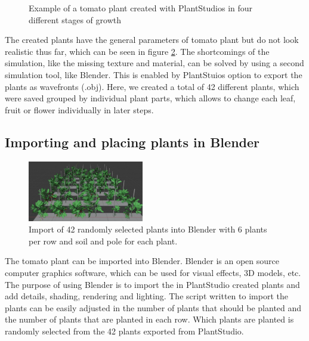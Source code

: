 \begin{figure}[ht]
\begin{subfigure}{.24\textwidth}
		\label{fig:sub4}
	\end{subfigure}%
	\caption{Example of a tomato plant created with PlantStudios in four different stages of growth}
	\label{fig:plantStudio}
	\vspace{-10pt}
\end{figure} 


The created plants have the general parameters of tomato plant but do not look realistic thus far, which can be seen in figure \ref{fig:plantStudio}. The shortcomings of the simulation, like the missing texture and material, can be solved by using a second simulation tool, like Blender. This is enabled by PlantStuios option to export the plants as wavefronts (.obj). Here, we created a total of 42 different plants, which were saved grouped by individual plant parts, which allows to change each leaf, fruit or flower individually in later steps.



\subsection{Importing and placing plants in Blender}

\begin{figure} 
	\vspace{-25pt}
	\begin{center}
		\includegraphics[width=0.45\textwidth]{BlenderImport.JPG}
		\caption{Import of 42 randomly selected plants into Blender with 6 plants per row and soil and pole for each plant.}
		\label{fig:BlenderImport}
	\end{center}
	\vspace{-20pt}
	\vspace{1pt}
\end{figure} 

The tomato plant can be imported into Blender. Blender is an open source computer graphics software, which can be used for visual effects, 3D models, etc. The purpose of using Blender is to import the in PlantStudio created plants and  add details, shading, rendering and lighting. The script written to import the plants can be easily adjusted in the number of plants that should be planted and the number of plants that are planted in each row. Which plants are planted is randomly selected from the 42 plants exported from PlantStudio.

